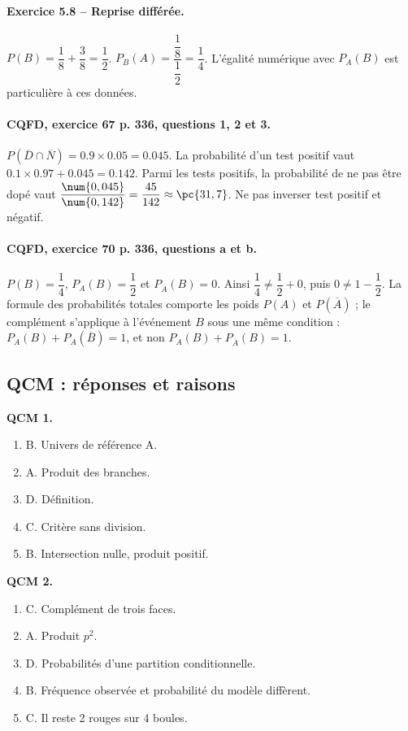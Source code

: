 \paragraph{Exercice 5.8 -- Reprise différée.} $P(B)=\dfrac{1}{8}+\dfrac{3}{8}=\dfrac{1}{2}$. $P_B(A)=\dfrac{\dfrac{1}{8}}{\dfrac{1}{2}}=\dfrac{1}{4}$. L’égalité numérique avec $P_A(B)$ est particulière à ces données.
\paragraph{CQFD, exercice 67 p. 336, questions 1, 2 et 3.} $P(\overline D\cap\overline N)=\num{0,9}\times\num{0,05}=\num{0,045}$. La probabilité d’un test positif vaut $\num{0,1}\times\num{0,97}+\num{0,045}=\num{0,142}$. Parmi les tests positifs, la probabilité de ne pas être dopé vaut $\dfrac{\num{0,045}}{\num{0,142}}=\dfrac{45}{142}\approx\pc{31,7}$. Ne pas inverser test positif et négatif.
\paragraph{CQFD, exercice 70 p. 336, questions a et b.} $P(B)=\dfrac14$, $P_A(B)=\dfrac12$ et $P_{\overline A}(B)=0$. Ainsi $\dfrac14\ne\dfrac12+0$, puis $0\ne1-\dfrac12$. La formule des probabilités totales comporte les poids $P(A)$ et $P(\overline A)$ ; le complément s’applique à l’événement $B$ sous une même condition : $P_A(B)+P_A(\overline B)=1$, et non $P_A(B)+P_{\overline A}(B)=1$.
\subsection*{QCM : réponses et raisons}
\textbf{QCM 1.}
\begin{enumerate}
\item B. Univers de référence A.
\item A. Produit des branches.
\item D. Définition.
\item C. Critère sans division.
\item B. Intersection nulle, produit positif.
\end{enumerate}
\textbf{QCM 2.}
\begin{enumerate}
\item C. Complément de trois faces.
\item A. Produit $p^2$.
\item D. Probabilités d’une partition conditionnelle.
\item B. Fréquence observée et probabilité du modèle diffèrent.
\item C. Il reste 2 rouges sur 4 boules.
\end{enumerate}
